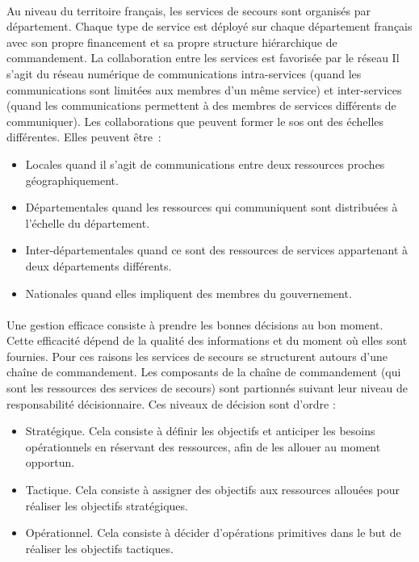 \paragraph{} 
Au niveau du territoire français, les services de secours sont organisés par
département. Chaque type de service est déployé sur chaque département français
avec son propre financement et sa propre structure hiérarchique de commandement. La collaboration entre
les services est favorisée par le réseau
Il s'agit du
 réseau numérique de communications intra-services
(quand les communications sont limitées aux membres d'un même service) et inter-services (quand
les communications permettent à des membres de services différents de communiquer). Les
collaborations que peuvent former le sos ont des échelles différentes.
Elles peuvent être~: 
\begin{itemize}
\item Locales quand il s'agit de
communications entre deux ressources proches géographi\-quement. 
\item Départementales quand les ressources qui communiquent sont distribuées à l'échelle du
département. 
\item Inter-départementales quand ce sont des ressources de services appartenant
à deux départements différents.
\item Nationales quand elles impliquent des membres du gouvernement. 
\end{itemize} 

\paragraph{} 
Une gestion efficace consiste à
prendre les bonnes décisions au bon moment. Cette efficacité dépend de la
qualité des informations et du moment où elles sont fournies. Pour ces raisons
les services de secours se structurent autours d'une chaîne de
commandement. Les composants de la chaîne de commandement (qui sont les
ressources des services de secours) sont partionnés suivant leur niveau de
responsabilité décisionnaire. Ces niveaux de décision sont d'ordre : 
\begin{itemize}
\item Stratégique. Cela consiste à définir les objectifs et anticiper les besoins opéra\-tionnels en
réservant des ressources, afin de les allouer au moment opportun.
\item Tactique. Cela consiste à assigner des
objectifs aux ressources allouées
pour réaliser les objectifs stratégiques. 
\item Opérationnel. Cela consiste à décider d'opérations primitives dans le but
de réaliser les objectifs tactiques. 
\end{itemize}

